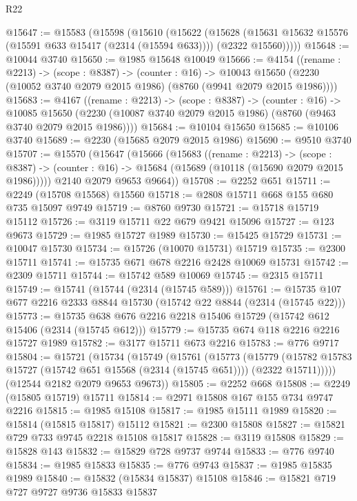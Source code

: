 \begin{lexlean}{R22}
\begin{coremodule}
@15647 := @15583
    (@15598
      (@15610
        (@15622
          (@15628
            (@15631 @15632 @15576 (@15591 @633 @15417 (@2314 (@15594 @633))))
            (@2322 @15560)))))
@15648 := @10044 @3740
@15650 := @1985 @15648 @10049
@15666 := @4154
    ((rename : @2213) ->
    (scope : @8387) ->
    (counter : @16) ->
    @10043 @15650 (@2230 (@10052 @3740 @2079 @2015 @1986) (@8760 (@9941 @2079 @2015 @1986))))
@15683 := @4167
    ((rename : @2213) ->
    (scope : @8387) ->
    (counter : @16) ->
    @10085 @15650 (@2230 (@10087 @3740 @2079 @2015 @1986) (@8760 (@9463 @3740 @2079 @2015 @1986))))
@15684 := @10104 @15650
@15685 := @10106 @3740
@15689 := @2230 (@15685 @2079 @2015 @1986)
@15690 := @9510 @3740
@15707 := @15570
    (@15647
      (@15666
        (@15683
          ((rename : @2213) ->
          (scope : @8387) ->
          (counter : @16) -> @15684 (@15689 (@10118 (@15690 @2079 @2015 @1986)))))
        @2140
        @2079
        @9653
        @9664))
@15708 := @2252 @651
@15711 := @2249 (@15708 @15568) @15560
@15718 := @2808 @15711 @668 @155 @680 @735 @15097 @9749
@15719 := @8760 @9730
@15721 := @15718 @15719 @15112
@15726 := @3119 @15711 @22 @679 @9421 @15096
@15727 := @123 @9673
@15729 := @1985 @15727 @1989
@15730 := @15425 @15729
@15731 := @10047 @15730
@15734 := @15726 (@10070 @15731) @15719
@15735 := @2300 @15711
@15741 := @15735 @671 @678 @2216 @2428 @10069 @15731
@15742 := @2309 @15711
@15744 := @15742 @589 @10069
@15745 := @2315 @15711
@15749 := @15741 (@15744 (@2314 (@15745 @589)))
@15761 := @15735 @107 @677 @2216 @2333 @8844 @15730 (@15742 @22 @8844 (@2314 (@15745 @22)))
@15773 := @15735 @638 @676 @2216 @2218 @15406 @15729 (@15742 @612 @15406 (@2314 (@15745 @612)))
@15779 := @15735 @674 @118 @2216 @2216 @15727 @1989
@15782 := @3177 @15711 @673 @2216
@15783 := @776 @9717
@15804 := @15721
    (@15734
      (@15749
        (@15761
          (@15773
            (@15779
              (@15782 @15783 @15727 (@15742 @651 @15568 (@2314 (@15745 @651))))
              (@2322 @15711)))))
      (@12544 @2182 @2079 @9653 @9673))
@15805 := @2252 @668
@15808 := @2249 (@15805 @15719) @15711
@15814 := @2971 @15808 @167 @155 @734 @9747 @2216
@15815 := @1985 @15108
@15817 := @1985 @15111 @1989
@15820 := @15814 (@15815 @15817) @15112
@15821 := @2300 @15808
@15827 := @15821 @729 @733 @9745 @2218 @15108 @15817
@15828 := @3119 @15808
@15829 := @15828 @143
@15832 := @15829 @728 @9737 @9744
@15833 := @776 @9740
@15834 := @1985 @15833
@15835 := @776 @9743
@15837 := @1985 @15835 @1989
@15840 := @15832 (@15834 @15837) @15108
@15846 := @15821 @719 @727 @9727 @9736 @15833 @15837

\end{coremodule}
\end{lexlean}
